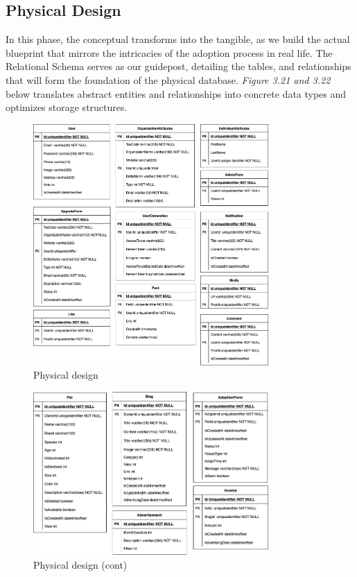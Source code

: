 \subsection{Physical Design}

In this phase, the conceptual transforms into the tangible, as we build the actual blueprint that mirrors the intricacies of the adoption process in real life. The Relational Schema serves as our guidepost, detailing the tables, and relationships that will form the foundation of the physical database. \textit{Figure 3.21 and 3.22} below translates abstract entities and relationships into concrete data types and optimizes storage structures.

\begin {figure}[H]
\centering
\includegraphics[width=0.8\textwidth]{Figures/DatabaseDesign/Entities-Physical_1.png}
\caption{Physical design}
\end{figure}

\begin {figure}[H]
\centering
\includegraphics[width=0.8\textwidth]{Figures/DatabaseDesign/Entities-Physical_2.png}
\caption{Physical design (cont)}
\end{figure}





